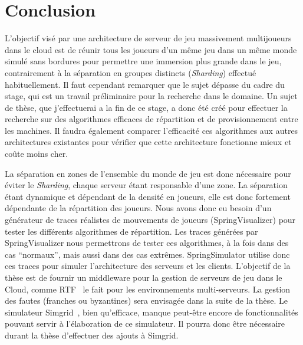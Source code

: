 \section{Conclusion}
L'objectif visé par une architecture de serveur de jeu massivement multijoueurs dans le cloud est de réunir tous les joueurs d'un même jeu dans un même monde simulé sans bordures pour permettre une immersion plus grande dans le jeu, contrairement à la séparation en groupes distincts (\textit{Sharding}) effectué habituellement.
Il faut cependant remarquer que le sujet dépasse du cadre du stage, qui est un travail préliminaire pour la recherche dans le domaine.
Un sujet de thèse, que j'effectuerai a la fin de ce stage, a donc été créé pour effectuer la recherche sur des algorithmes efficaces de répartition et de provisionnement entre les machines.
Il faudra également comparer l'efficacité ces algorithmes aux autres architectures existantes pour vérifier que cette architecture fonctionne mieux et coûte moins cher.

La séparation en zones de l'ensemble du monde de jeu est donc nécessaire pour éviter le \textit{Sharding}, chaque serveur étant responsable d'une zone.
La séparation étant dynamique et dépendant de la densité en joueurs, elle est donc fortement dépendante de la répartition des joueurs.
Nous avons donc eu besoin d'un générateur de traces réalistes de mouvements de joueurs (SpringVisualizer) pour tester les différents algorithmes de répartition.
Les traces générées par SpringVisualizer nous permettrons de tester ces algorithmes, à la fois dans des cas ``normaux'', mais aussi dans des cas extrêmes.
SpringSimulator utilise donc ces traces pour simuler l'architecture des serveurs et les clients.
L'objectif de la thèse est de fournir un middleware pour la gestion de serveurs de jeu dans le Cloud, comme RTF~\cite{rtf_middleware_development} le fait pour les environnements multi-serveurs.
La gestion des fautes (franches ou byzantines) sera envisagée dans la suite de la thèse.
Le simulateur Simgrid~\cite{simgrid}, bien qu'efficace, manque peut-être encore de fonctionnalités pouvant servir à l'élaboration de ce simulateur.
Il pourra donc être nécessaire durant la thèse d'effectuer des ajouts à Simgrid.
